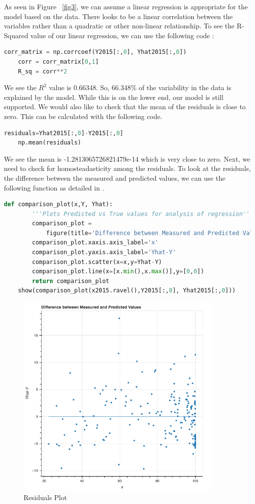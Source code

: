 \documentclass[12pt]{article}
\begin{document}
As seen in Figure ~\ref{fig3}, we can assume a linear regression is appropriate for the model based on the data. There looks to be a linear correlation between the variables rather than a quadratic or other non-linear relationship. To see the R-Squared value of our linear regression, we can use the following code \citep{pythonr2}:
\begin{lstlisting}[language=Python]
    corr_matrix = np.corrcoef(Y2015[:,0], Yhat2015[:,0])
    corr = corr_matrix[0,1]
    R_sq = corr**2
\end{lstlisting}
We see the $R^2$ value is 0.66348. So, 66.348\% of the variability in the data is explained by the model. While this is on the lower end, our model is still supported. We would also like to check that the mean of the residuals is close to zero. This can be calculated with the following code.
\begin{lstlisting}[language=Python]
    residuals=Yhat2015[:,0]-Y2015[:,0]
    np.mean(residuals)
\end{lstlisting}
We see the mean is -1.2813065726821479e-14 which is very close to zero. Next, we need to check for homosteadasticity among the residuals. To look at the residuals, the difference between the measured and predicted values, we can use the following function as detailed in \citet{teitelbaum2021linreg}.
\begin{lstlisting}[language=Python]
    def comparison_plot(x,Y, Yhat):
        '''Plots Predicted vs True values for analysis of regression'''
        comparison_plot = 
            figure(title='Difference between Measured and Predicted Values')
        comparison_plot.xaxis.axis_label='x'
        comparison_plot.yaxis.axis_label='Yhat-Y'
        comparison_plot.scatter(x=x,y=Yhat-Y)
        comparison_plot.line(x=[x.min(),x.max()],y=[0,0])
        return comparison_plot
    show(comparison_plot(x2015.ravel(),Y2015[:,0], Yhat2015[:,0]))
\end{lstlisting}

\begin{figure}
    \centering
    \includegraphics[width=4in]{Figures/figure3.png}
    \caption{Residuals Plot}
    \label{fig5}
\end{figure}
\end{document}
